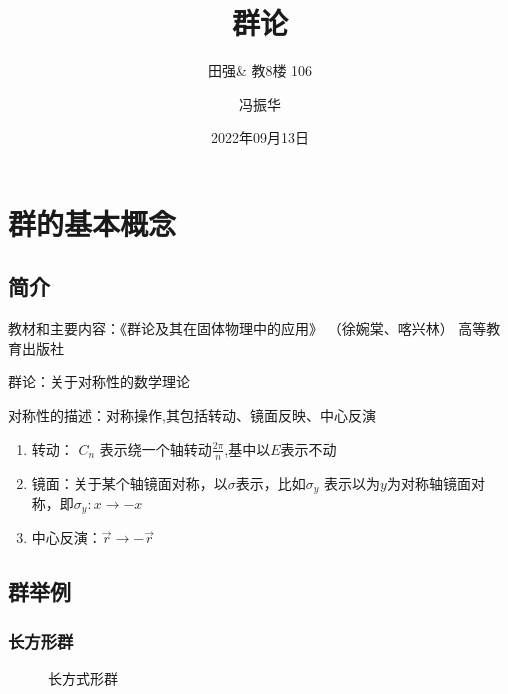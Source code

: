\documentclass[math=mtpro2,lang=cn,color=green]{elegantbook}
\begin{document}
\title{群论}
\subtitle{田强\& 教8楼 106}
\author{冯振华}
\date{2022年09月13日}
\maketitle
\frontmatter
\tableofcontents
\mainmatter

\chapter{群的基本概念}

\section{简介}

教材和主要内容：《群论及其在固体物理中的应用》 （徐婉棠、喀兴林） 高等教育出版社

群论：关于对称性的数学理论

对称性的描述：对称操作,其包括转动、镜面反映、中心反演

\begin{enumerate}
   \item 转动： $C_n$ 表示绕一个轴转动$\frac{2\pi}{n}$,基中以$E$表示不动
   \item 镜面：关于某个轴镜面对称，以$\sigma$表示，比如$\sigma_y$ 表示以为$y$为对称轴镜面对称，即$\sigma_y : x\rightarrow -x$
   \item 中心反演：$\vec{r}\rightarrow -\vec{r}$
\end{enumerate}

\section{群举例}

\subsection{长方形群}

\begin{figure}[H]
   \centering
   \caption{长方式形群}
   \label{fig:group1}
\end{figure}
\end{document}
